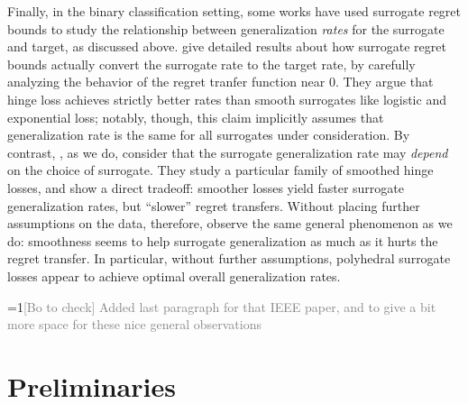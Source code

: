 \documentclass{article}
\theoremstyle{definition}\newtheorem{definition}{Definition}
\theoremstyle{definition}\newtheorem{assumption}{Assumption}
\newcommand{\Comments}{1}
\newcommand{\mynote}[2]{\ifnum\Comments=1\textcolor{#1}{#2}\fi}
\newcommand{\bocheck}[1]{\mynote{gray}{[Bo to check] #1}}
\begin{document}
Finally, in the binary classification setting, some works have used surrogate regret bounds to study the relationship between generalization \emph{rates} for the surrogate and target, as discussed above.
\citet{zhang2021rates} give detailed results about how surrogate regret bounds actually convert the surrogate rate to the target rate, by carefully analyzing the behavior of the regret tranfer function near 0.
They argue that hinge loss achieves strictly better rates than smooth surrogates like logistic and exponential loss; notably, though, this claim implicitly assumes that generalization rate is the same for all surrogates under consideration.
By contrast, \citet{mahdavi2014binary}, as we do, consider that the surrogate generalization rate may \emph{depend} on the choice of surrogate.
They study a particular family of smoothed hinge losses, and show a direct tradeoff: smoother losses yield faster surrogate generalization rates, but ``slower'' regret transfers.
Without placing further assumptions on the data, therefore, \citet{mahdavi2014binary} observe the same general phenomenon as we do: smoothness seems to help surrogate generalization as much as it hurts the regret transfer.
In particular, without further assumptions, polyhedral surrogate losses appear to achieve optimal overall generalization rates.

\bocheck{Added last paragraph for that IEEE paper, and to give a bit more space for these nice general observations}


\section{Preliminaries}

\end{document}
